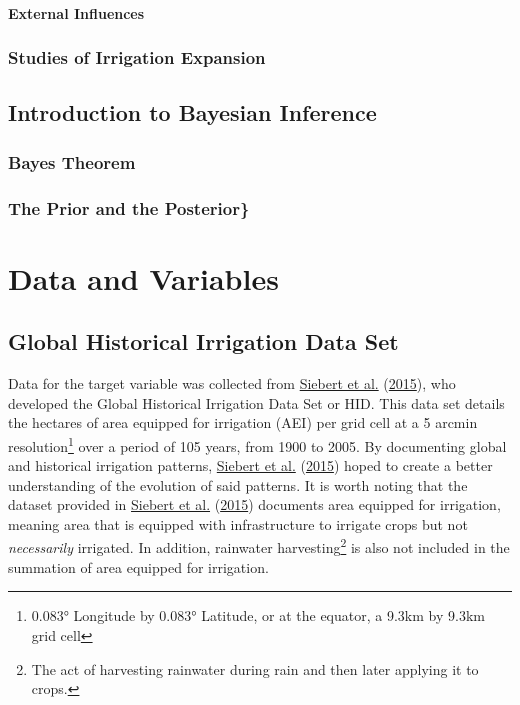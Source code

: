 \documentclass[12pt,twoside]{reedthesis}
\begin{document}
\hypertarget{extinf}{%
\subsubsection{External Influences}\label{extinf}}

\hypertarget{irrmodslit}{%
\subsection{Studies of Irrigation Expansion}\label{irrmodslit}}

\hypertarget{bayesintro}{%
\section{Introduction to Bayesian Inference}\label{bayesintro}}

\hypertarget{bayesthe}{%
\subsection{Bayes Theorem}\label{bayesthe}}

\hypertarget{priorpost}{%
\subsection{The Prior and the Posterior\}}\label{priorpost}}

\hypertarget{datavar}{%
\chapter{Data and Variables}\label{datavar}}

\hypertarget{global-historical-irrigation-data-set}{%
\section{Global Historical Irrigation Data Set}\label{global-historical-irrigation-data-set}}

Data for the target variable was collected from \protect\hyperlink{ref-siebertGlobalDataSet2015}{Siebert et al.} (\protect\hyperlink{ref-siebertGlobalDataSet2015}{2015}), who developed the Global Historical Irrigation Data Set or HID. This data set details the hectares of area equipped for irrigation (AEI) per grid cell at a 5 arcmin resolution\footnote{0.083° Longitude by 0.083° Latitude, or at the equator, a 9.3km by 9.3km grid cell} over a period of 105 years, from 1900 to 2005. By documenting global and historical irrigation patterns, \protect\hyperlink{ref-siebertGlobalDataSet2015}{Siebert et al.} (\protect\hyperlink{ref-siebertGlobalDataSet2015}{2015}) hoped to create a better understanding of the evolution of said patterns. It is worth noting that the dataset provided in \protect\hyperlink{ref-siebertGlobalDataSet2015}{Siebert et al.} (\protect\hyperlink{ref-siebertGlobalDataSet2015}{2015}) documents area equipped for irrigation, meaning area that is equipped with infrastructure to irrigate crops but not \emph{necessarily} irrigated. In addition, rainwater harvesting\footnote{The act of harvesting rainwater during rain and then later applying it to crops.} is also not included in the summation of area equipped for irrigation.
\end{document}
